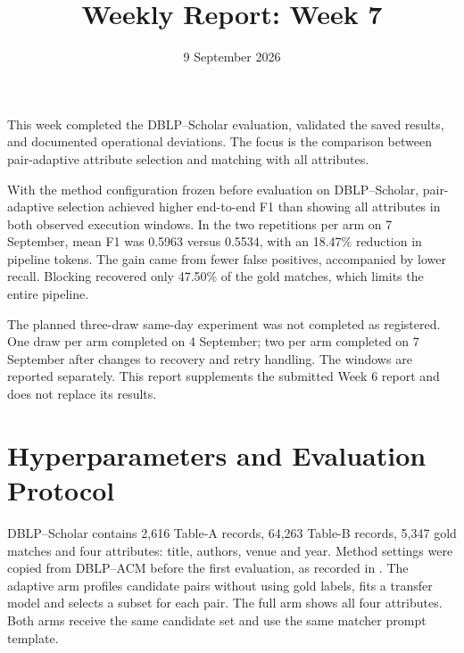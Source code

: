 \documentclass[11pt]{article}
\title{Weekly Report: Week 7}
\author{}
\date{9 September 2026}
\begin{document}
\maketitle

This week completed the DBLP--Scholar evaluation, validated the saved results,
and documented operational deviations. The focus is the comparison between
pair-adaptive attribute selection and matching with all attributes.

With the method configuration frozen before evaluation on DBLP--Scholar,
pair-adaptive selection achieved higher end-to-end F1 than showing all attributes
in both observed execution windows. In the two repetitions per arm on 7 September,
mean F1 was 0.5963 versus 0.5534, with an 18.47\% reduction in pipeline tokens.
The gain came from fewer false positives, accompanied by lower recall.
Blocking recovered only 47.50\% of the gold matches, which limits the entire pipeline.

The planned three-draw same-day experiment was not completed as registered.
One draw per arm completed on 4 September; two per arm completed on 7 September
after changes to recovery and retry handling. The windows are reported separately.
This report supplements the submitted Week 6 report and does not replace its results.

\section{Hyperparameters and Evaluation Protocol}
DBLP--Scholar contains 2,616 Table-A records, 64,263 Table-B records, 5,347
gold matches and four attributes: title, authors, venue and year. Method settings
were copied from DBLP--ACM before the first evaluation, as recorded in
. The adaptive arm profiles
candidate pairs without using gold labels, fits a transfer model and selects a
subset for each pair. The full arm shows all four attributes. Both arms receive
the same candidate set and use the same matcher prompt template.
\end{document}
